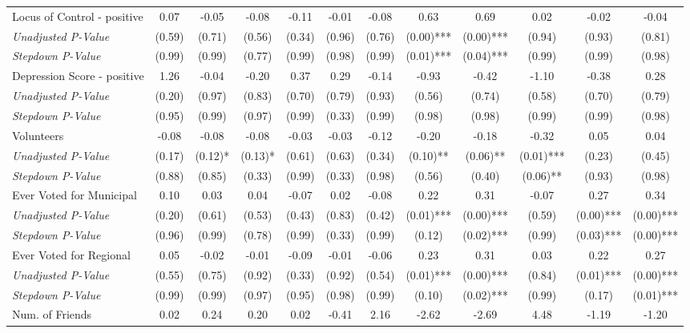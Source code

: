 \begin{tabular}{l c c c c c c c c c c c}
Locus of Control - positive & 0.07 & -0.05 & -0.08 & -0.11 & -0.01 & -0.08 & 0.63 & 0.69 & 0.02 & -0.02 & -0.04 \\
\quad \textit{Unadjusted P-Value} & (0.59) & (0.71) & (0.56) & (0.34) & (0.96) & (0.76) & (0.00)*** & (0.00)*** & (0.94) & (0.93) & (0.81) \\
\quad \textit{Stepdown P-Value} & (0.99) & (0.99) & (0.77) & (0.99) & (0.98) & (0.99) & (0.01)*** & (0.04)*** & (0.99) & (0.99) & (0.98) \\
Depression Score - positive & 1.26 & -0.04 & -0.20 & 0.37 & 0.29 & -0.14 & -0.93 & -0.42 & -1.10 & -0.38 & 0.28 \\
\quad \textit{Unadjusted P-Value} & (0.20) & (0.97) & (0.83) & (0.70) & (0.79) & (0.93) & (0.56) & (0.74) & (0.58) & (0.70) & (0.79) \\
\quad \textit{Stepdown P-Value} & (0.95) & (0.99) & (0.97) & (0.99) & (0.33) & (0.99) & (0.98) & (0.98) & (0.99) & (0.99) & (0.98) \\
Volunteers & -0.08 & -0.08 & -0.08 & -0.03 & -0.03 & -0.12 & -0.20 & -0.18 & -0.32 & 0.05 & 0.04 \\
\quad \textit{Unadjusted P-Value} & (0.17) & (0.12)* & (0.13)* & (0.61) & (0.63) & (0.34) & (0.10)** & (0.06)** & (0.01)*** & (0.23) & (0.45) \\
\quad \textit{Stepdown P-Value} & (0.88) & (0.85) & (0.33) & (0.99) & (0.33) & (0.98) & (0.56) & (0.40) & (0.06)** & (0.93) & (0.98) \\
Ever Voted for Municipal & 0.10 & 0.03 & 0.04 & -0.07 & 0.02 & -0.08 & 0.22 & 0.31 & -0.07 & 0.27 & 0.34 \\
\quad \textit{Unadjusted P-Value} & (0.20) & (0.61) & (0.53) & (0.43) & (0.83) & (0.42) & (0.01)*** & (0.00)*** & (0.59) & (0.00)*** & (0.00)*** \\
\quad \textit{Stepdown P-Value} & (0.96) & (0.99) & (0.78) & (0.99) & (0.33) & (0.99) & (0.12) & (0.02)*** & (0.99) & (0.03)*** & (0.00)*** \\
Ever Voted for Regional & 0.05 & -0.02 & -0.01 & -0.09 & -0.01 & -0.06 & 0.23 & 0.31 & 0.03 & 0.22 & 0.27 \\
\quad \textit{Unadjusted P-Value} & (0.55) & (0.75) & (0.92) & (0.33) & (0.92) & (0.54) & (0.01)*** & (0.00)*** & (0.84) & (0.01)*** & (0.00)*** \\
\quad \textit{Stepdown P-Value} & (0.99) & (0.99) & (0.97) & (0.95) & (0.98) & (0.99) & (0.10) & (0.02)*** & (0.99) & (0.17) & (0.01)*** \\
Num. of Friends & 0.02 & 0.24 & 0.20 & 0.02 & -0.41 & 2.16 & -2.62 & -2.69 & 4.48 & -1.19 & -1.20 \\

\end{tabular}
